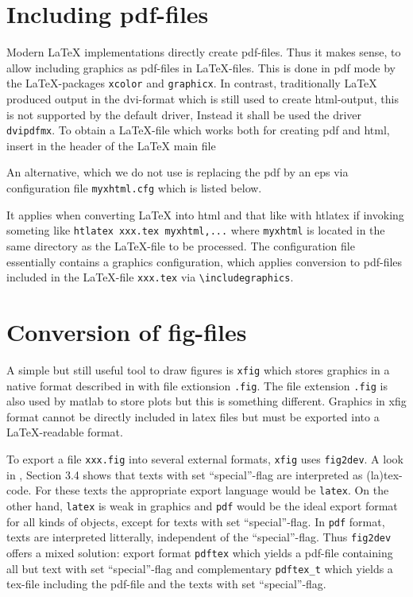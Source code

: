 \documentclass[12pt]{book}
\begin{document}
\section{Including pdf-files}\label{sec:figpdf}

Modern \LaTeX{} implementations directly create pdf-files. 
Thus it makes sense, to allow including graphics as pdf-files 
in \LaTeX-files. 
This is done in pdf mode 
by the \LaTeX-packages {\tt xcolor} and {\tt graphicx}. 
In contrast, traditionally \LaTeX{} produced output in the \gls{dvi}-format 
which is still used to create \gls{html}-output, 
this is not supported by the default driver, 
Instead it shall be used the driver {\tt dvipdfmx}. 
To obtain a \LaTeX-file which works both for creating pdf and html, 
insert in the header of the \LaTeX{} main file 
%
\lstset{language=tex, basicstyle=\small}


An alternative, which we do not use 
is replacing the pdf by an \gls{eps} via configuration file {\tt myxhtml.cfg} 
which is listed below. 
%
\lstset{language=tex, basicstyle=\scriptsize}

%
It applies when converting \LaTeX{} into html and that like 
with htlatex if invoking someting like {\tt htlatex xxx.tex myxhtml,...} 
where {\tt myxhtml} is located in the same directory as the \LaTeX-file 
to be processed. 
The configuration file essentially contains a graphics configuration, 
which applies conversion to pdf-files included in the \LaTeX-file {\tt xxx.tex}
via {\tt \textbackslash includegraphics}. 


\section{Conversion of fig-files}\label{sec:fig2dev}

A simple but still useful tool to draw figures is {\tt xfig} 
which stores graphics in a native format 
described in \cite{XFigF} with file extionsion {\tt .fig}. 
The file extension {\tt .fig} is also used by matlab to store plots 
but this is something different. 
Graphics in xfig format cannot be directly included in latex files 
but must be exported into a \LaTeX-readable format. 

To export a file {\tt xxx.fig} into several external formats, 
{\tt xfig} uses {\tt fig2dev}. 
A look in \cite{XFigF}, Section 3.4 shows that texts with set ``special''-flag 
are interpreted as (la)tex-code. 
For these texts the appropriate export language would be {\tt latex}. 
On the other hand, {\tt latex} is weak in graphics 
and {\tt pdf} would be the ideal export format for all kinds of objects, 
except for texts with set ``special''-flag. 
In {\tt pdf} format, texts are interpreted litterally, 
independent of the ``special''-flag. 
Thus {\tt fig2dev} offers a mixed solution: 
export format {\tt pdftex} which yields a pdf-file 
containing all but text with set ``special''-flag 
and complementary {\tt pdftex\_t} which yields a tex-file 
including the pdf-file and the texts with set ``special''-flag. 
\end{document}
